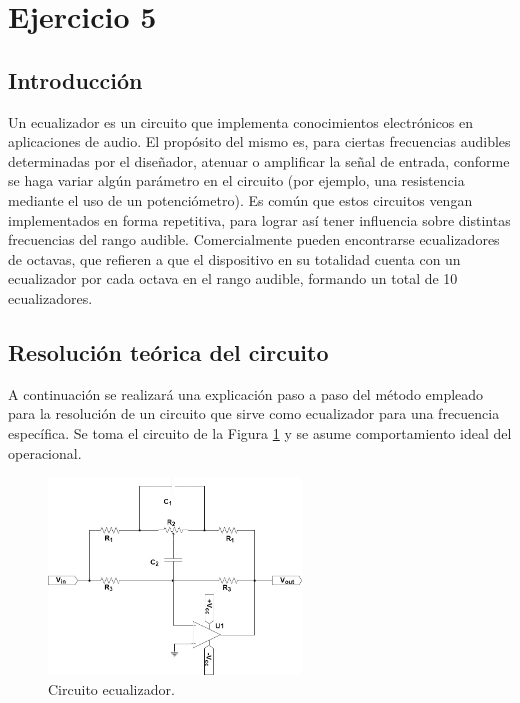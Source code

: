 \section{Ejercicio 5}
\subsection{Introducción} \label{sec:intro_ex5}
Un ecualizador es un circuito que implementa conocimientos electrónicos en aplicaciones de audio.
El propósito del mismo es, para ciertas frecuencias audibles determinadas por el diseñador, atenuar o amplificar la señal de entrada, 
conforme se haga variar algún parámetro en el circuito (por ejemplo, una resistencia mediante el uso de un potenciómetro).
Es común que estos circuitos vengan implementados en forma repetitiva, para lograr así tener influencia sobre distintas frecuencias del rango audible.
Comercialmente pueden encontrarse ecualizadores de octavas, que refieren a que el dispositivo en su totalidad cuenta con un ecualizador por cada octava en el rango audible,
formando un total de 10 ecualizadores.



\subsection{Resolución teórica del circuito}
A continuación se realizará una explicación paso a paso del método empleado para la resolución de un circuito que sirve como ecualizador para una frecuencia específica.
Se toma el circuito de la Figura \ref{fig:EQ_module} y se asume comportamiento ideal del operacional.
\begin{figure}[H]
    \centering
    \includegraphics[width=0.6\textwidth]{../EJ5/latex_resources/EQ_module}
    \caption{Circuito ecualizador.}
    \label{fig:EQ_module}
\end{figure}

